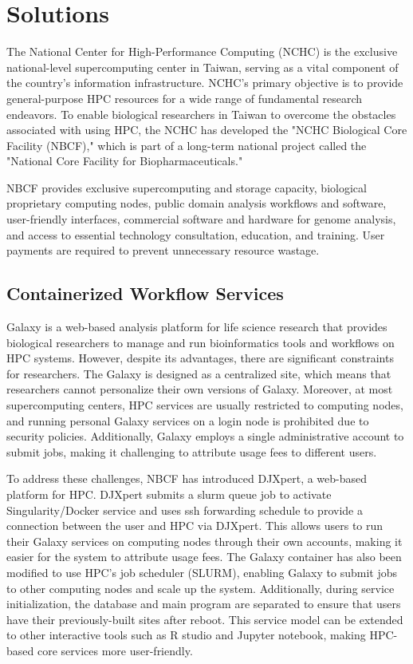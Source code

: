 \documentclass[conference]{IEEEtran}
\begin{document}
\section*{\textbf{Solutions}}
The National Center for High-Performance Computing (NCHC) is the exclusive national-level supercomputing center in Taiwan, serving as a vital component of the country's information infrastructure. NCHC’s primary objective is to provide general-purpose HPC resources for a wide range of fundamental research endeavors. To enable biological researchers in Taiwan to overcome the obstacles associated with using HPC, the NCHC has developed the "NCHC Biological Core Facility (NBCF)," which is part of a long-term national project called the "National Core Facility for Biopharmaceuticals."

NBCF provides exclusive supercomputing and storage capacity, biological proprietary computing nodes, public domain analysis workflows and software, user-friendly interfaces, commercial software and hardware for genome analysis, and access to essential technology consultation, education, and training. User payments are required to prevent unnecessary resource wastage.

\subsection{Containerized Workflow Services}
Galaxy \cite{b8} is a web-based analysis platform for life science research that provides biological researchers to manage and run bioinformatics tools and workflows on HPC systems. However, despite its advantages, there are significant constraints for researchers. The Galaxy is designed as a centralized site, which means that researchers cannot personalize their own versions of Galaxy. Moreover, at most supercomputing centers, HPC services are usually restricted to computing nodes, and running personal Galaxy services on a login node is prohibited due to security policies. Additionally, Galaxy employs a single administrative account to submit jobs, making it challenging to attribute usage fees to different users.

To address these challenges, NBCF has introduced DJXpert, a web-based platform for HPC. DJXpert submits a slurm queue job to activate Singularity/Docker service and uses ssh forwarding schedule to provide a connection between the user and HPC via DJXpert. This allows users to run their Galaxy services on computing nodes through their own accounts, making it easier for the system to attribute usage fees. The Galaxy container has also been modified to use HPC’s job scheduler (SLURM), enabling Galaxy to submit jobs to other computing nodes and scale up the system. Additionally, during service initialization, the database and main program are separated to ensure that users have their previously-built sites after reboot. This service model can be extended to other interactive tools such as R studio and Jupyter notebook, making HPC-based core services more user-friendly.
\end{document}
